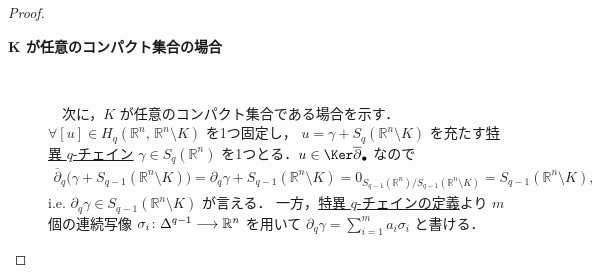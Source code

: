 \documentclass[algtopo_main]{subfiles}
\begin{document}
\begin{proof}
\begin{description}
\begin{description}
            \item[\textbf{$\bm{K}$ が任意のコンパクト集合の場合}]　
            
            　次に，$K$ が任意のコンパクト集合である場合を示す．$\forall [u] \in H_q(\mathbb{R}^n,\, \mathbb{R}^n \setminus K)$ を1つ固定し，
            $u = \gamma + S_q(\mathbb{R}^n \setminus K)$ を充たす\hyperref[def:singularsimplex]{特異 $q$-チェイン} $\gamma \in S_q(\mathbb{R}^n)$ を1つとる．$u \in \Ker \overline{\partial}_\bullet$ なので
            \begin{align}
                \overline{\partial}_q \bigl(\gamma + S_{q-1}(\mathbb{R}^n\setminus K)\bigr) = \partial_q \gamma + S_{q-1}(\mathbb{R}^n\setminus K) = 0_{S_{q-1}(\mathbb{R}^n)/S_{q-1}(\mathbb{R}^n\setminus K)} = S_{q-1}(\mathbb{R}^n \setminus K),
            \end{align}
            i.e. $\partial_q \gamma \in S_{q-1}(\mathbb{R}^n \setminus K)$ が言える．
            一方，\hyperref[def:singularsimplex]{特異 $q$-チェインの定義}より $m$ 個の連続写像 $\sigma_i \colon \Delta^{q-1} \longrightarrow \mathbb{R}^n$ を用いて $\partial_q \gamma = \sum_{i=1}^m a_i \sigma_i$ と書ける．
            

\end{description}
\end{description}
\end{proof}
\end{document}
